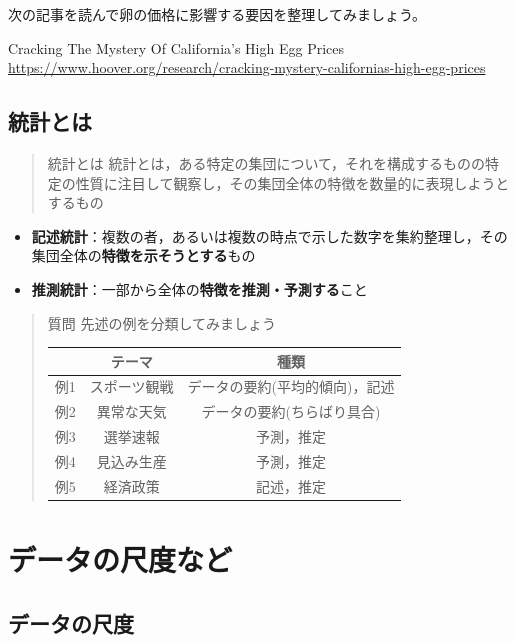 \documentclass[
]{book}
\providecommand{\tightlist}{%
  \setlength{\itemsep}{0pt}\setlength{\parskip}{0pt}}
\theoremstyle{definition}
\theoremstyle{definition}
\theoremstyle{definition}
\theoremstyle{definition}
\theoremstyle{remark}
\begin{document}
次の記事を読んで卵の価格に影響する要因を整理してみましょう。

Cracking The Mystery Of California's High Egg Prices　
\url{https://www.hoover.org/research/cracking-mystery-californias-high-egg-prices}

\hypertarget{ux7d71ux8a08ux3068ux306f}{%
\section{統計とは}\label{ux7d71ux8a08ux3068ux306f}}

\begin{quote}
統計とは
統計とは，ある特定の集団について，それを構成するものの特定の性質に注目して観察し，その集団全体の特徴を数量的に表現しようとするもの
\end{quote}

\begin{itemize}
\tightlist
\item
  \textbf{記述統計}：複数の者，あるいは複数の時点で示した数字を集約整理し，その集団全体の\textbf{特徴を示そうとする}もの
\item
  \textbf{推測統計}：一部から全体の\textbf{特徴を推測・予測する}こと
\end{itemize}

\begin{quote}
質問
先述の例を分類してみましょう

\begin{longtable}[]{@{}ccc@{}}
\toprule()
& テーマ & 種類 \\
\midrule()
\endhead
例1 & スポーツ観戦 & データの要約(平均的傾向)，記述 \\
例2 & 異常な天気 & データの要約(ちらばり具合) \\
例3 & 選挙速報 & 予測，推定 \\
例4 & 見込み生産 & 予測，推定 \\
例5 & 経済政策 & 記述，推定 \\
\bottomrule()
\end{longtable}
\end{quote}

\hypertarget{ux30c7ux30fcux30bfux306eux5c3aux5ea6ux306aux3069}{%
\chapter{データの尺度など}\label{ux30c7ux30fcux30bfux306eux5c3aux5ea6ux306aux3069}}

\hypertarget{ux30c7ux30fcux30bfux306eux5c3aux5ea6}{%
\section{データの尺度}\label{ux30c7ux30fcux30bfux306eux5c3aux5ea6}}
\end{document}
